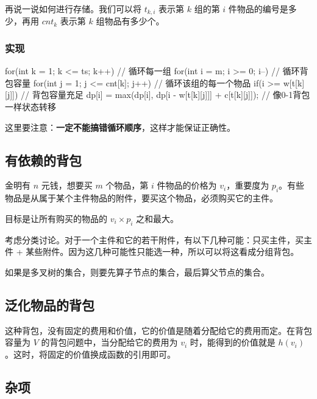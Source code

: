 再说一说如何进行存储。我们可以将 \(t_{k,i}\) 表示第 \(k\) 组的第 \(i\) 件物品的编号是多少，再用 \(\mathit{cnt}_k\) 表示第 \(k\) 组物品有多少个。

\subsubsection{实现}\label{ux5b9eux73b0-3}


\begin{codeline}
for(int k = 1; k <= ts; k++) {             // 循环每一组
    for(int i = m; i >= 0; i--) {          // 循环背包容量
        for(int j = 1; j <= cnt[k]; j++) { // 循环该组的每一个物品
            if(i >= w[t[k][j]]) {          // 背包容量充足
                dp[i] = max(dp[i],
                            dp[i - w[t[k][j]]] + c[t[k][j]]); // 像0-1背包一样状态转移
            }
        }
    }
}
\end{codeline}


这里要注意：\textbf{一定不能搞错循环顺序}，这样才能保证正确性。

\subsection{有依赖的背包}\label{ux6709ux4f9dux8d56ux7684ux80ccux5305}

金明有 \(n\) 元钱，想要买 \(m\) 个物品，第 \(i\) 件物品的价格为 \(v_i\)，重要度为 \(p_i\)。有些物品是从属于某个主件物品的附件，要买这个物品，必须购买它的主件。

目标是让所有购买的物品的 \(v_i \times p_i\) 之和最大。

考虑分类讨论。对于一个主件和它的若干附件，有以下几种可能：只买主件，买主件 + 某些附件。因为这几种可能性只能选一种，所以可以将这看成分组背包。

如果是多叉树的集合，则要先算子节点的集合，最后算父节点的集合。

\subsection{泛化物品的背包}\label{ux6cdbux5316ux7269ux54c1ux7684ux80ccux5305}

这种背包，没有固定的费用和价值，它的价值是随着分配给它的费用而定。在背包容量为 \(V\) 的背包问题中，当分配给它的费用为 \(v_i\) 时，能得到的价值就是 \(h\left(v_i\right)\)。这时，将固定的价值换成函数的引用即可。

\subsection{杂项}\label{ux6742ux9879}

